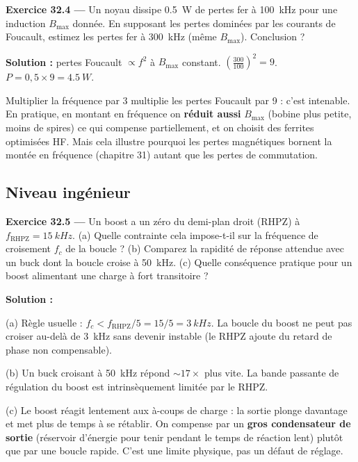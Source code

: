 \documentclass[12pt,a4paper,twoside]{book}
\begin{document}
\textbf{Exercice 32.4 ---} Un noyau dissipe \SI{0.5}{W} de pertes fer à \SI{100}{kHz} pour une induction $B_{\max}$ donnée. En supposant les pertes dominées par les courants de Foucault, estimez les pertes fer à \SI{300}{kHz} (même $B_{\max}$). Conclusion ?

\begin{pratique}
\textbf{Solution :} pertes Foucault $\propto f^2$ à $B_{\max}$ constant. $\left(\frac{300}{100}\right)^2 = 9$. $P = 0{,}5\times9 = \SI{4.5}{W}$.

Multiplier la fréquence par 3 multiplie les pertes Foucault par 9 : c'est intenable. En pratique, en montant en fréquence on \textbf{réduit aussi} $B_{\max}$ (bobine plus petite, moins de spires) ce qui compense partiellement, et on choisit des ferrites optimisées HF. Mais cela illustre pourquoi les pertes magnétiques bornent la montée en fréquence (chapitre 31) autant que les pertes de commutation.
\end{pratique}

\subsection*{Niveau ingénieur}

\textbf{Exercice 32.5 ---} Un boost a un zéro du demi-plan droit (RHPZ) à $f_{\text{RHPZ}} = \SI{15}{kHz}$. (a) Quelle contrainte cela impose-t-il sur la fréquence de croisement $f_c$ de la boucle ? (b) Comparez la rapidité de réponse attendue avec un buck dont la boucle croise à \SI{50}{kHz}. (c) Quelle conséquence pratique pour un boost alimentant une charge à fort transitoire ?

\begin{pratique}
\textbf{Solution :}

(a) Règle usuelle : $f_c < f_{\text{RHPZ}}/5 = 15/5 = \SI{3}{kHz}$. La boucle du boost ne peut pas croiser au-delà de \SI{3}{kHz} sans devenir instable (le RHPZ ajoute du retard de phase non compensable).

(b) Un buck croisant à \SI{50}{kHz} répond $\sim 17\times$ plus vite. La bande passante de régulation du boost est intrinsèquement limitée par le RHPZ.

(c) Le boost réagit lentement aux à-coups de charge : la sortie plonge davantage et met plus de temps à se rétablir. On compense par un \textbf{gros condensateur de sortie} (réservoir d'énergie pour tenir pendant le temps de réaction lent) plutôt que par une boucle rapide. C'est une limite physique, pas un défaut de réglage.
\end{pratique}
\end{document}
